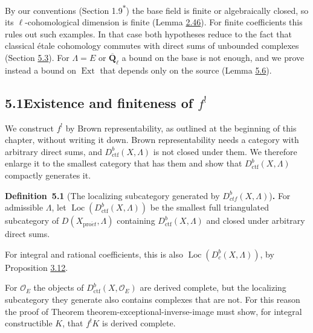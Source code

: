 \documentclass[11pt]{article}
\newenvironment{bpstatement}[2]{\par\addvspace{0.6\baselineskip}\noindent\textbf{#1}#2\textbf{.}\enspace\ignorespaces}
  {\par\addvspace{0.4\baselineskip}}
\newcommand{\bpout}[1]{#1\textsuperscript{\hyperlink{bp-outside}{\ensuremath{\ast}}}}
\providecommand{\Dbc}{}\renewcommand{\Dbc}{D^b_c}
\providecommand{\Dctf}{}\renewcommand{\Dctf}{D^b_{ctf}}
\providecommand{\Ext}{}\renewcommand{\Ext}{\operatorname{Ext}}
\providecommand{\Loc}{}\renewcommand{\Loc}{\operatorname{Loc}}
\begin{document}
By our conventions (Section \bpout{1.9}) the base field is finite or algebraically closed, so its \(\ell\)-cohomological dimension is finite (Lemma \hyperref[bp139]{2.46}). For finite coefficients this rules out such examples. In that case both hypotheses reduce to the fact that classical étale cohomology commutes with direct sums of unbounded complexes (Section \hyperref[bp449]{5.3}). For \(\Lambda=E\) or \(\overline{\mathbf Q}_\ell\) a bound on the base is not enough, and we prove instead a bound on \(\Ext\) that depends only on the source (Lemma \hyperref[bp426]{5.6}).

\subsection*{\texorpdfstring{5.1\quad Existence and finiteness of $f^!$}{5.1 Existence and finiteness of f!}}
\label{bp409}%
\label{bp410}%
We construct \(f^!\) by Brown representability, as outlined at the beginning of this chapter, without writing it down. Brown representability needs a category with arbitrary direct sums, and \(D^b_{\mathrm{ctf}}(X,\Lambda)\) is not closed under them. We therefore enlarge it to the smallest category that has them and show that \(D^b_{\mathrm{ctf}}(X,\Lambda)\) compactly generates it.

\label{bp411}%
\begin{bpstatement}{Definition~5.1}{ (The localizing subcategory generated by $\Dctf(X,\Lambda)$)}
For admissible \(\Lambda\), let \(\Loc(D^b_{\mathrm{ctf}}(X,\Lambda))\) be the smallest full triangulated subcategory of \(D(X_{\mathrm{pro}\acute{e}t},\Lambda)\) containing \(D^b_{\mathrm{ctf}}(X,\Lambda)\) and closed under arbitrary direct sums.
\end{bpstatement}

\label{bp412}%
For integral and rational coefficients, this is also \(\Loc(\Dbc(X,\Lambda))\), by Proposition \hyperref[bp232]{3.12}.

For \(\mathcal O_E\) the objects of \(D^b_{\mathrm{ctf}}(X,\mathcal O_E)\) are derived complete, but the localizing subcategory they generate also contains complexes that are not. For this reason the proof of Theorem theorem-exceptional-inverse-image must show, for integral constructible \(K\), that \(f^!K\) is derived complete.
\end{document}
